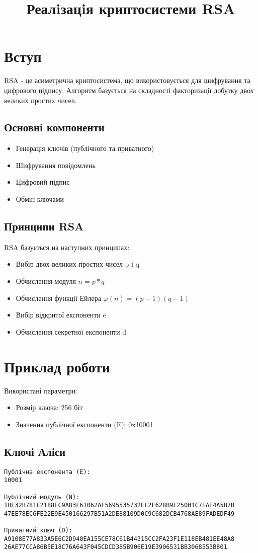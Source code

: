 \documentclass[12pt]{article}
\title{\textbf{Реалiзацiя криптосистеми RSA}}
\author{}
\date{}
\begin{document}
\maketitle

\section{Вступ}
RSA - це асиметрична криптосистема, що використовується для шифрування та цифрового підпису. Алгоритм базується на складності факторизації добутку двох великих простих чисел.

\subsection{Основні компоненти}
\begin{itemize}
  \item Генерація ключів (публічного та приватного)
  \item Шифрування повідомлень
  \item Цифровий підпис
  \item Обмін ключами
\end{itemize}

\subsection{Принципи RSA}
RSA базується на наступних принципах:
\begin{itemize}
  \item Вибір двох великих простих чисел p і q
  \item Обчислення модуля \(n = p * q\)
  \item Обчислення функції Ейлера \(φ(n) = (p-1)(q-1)\)
  \item Вибір відкритої експоненти e
  \item Обчислення секретної експоненти d
\end{itemize}

\section{Приклад роботи}

Використані параметри:
\begin{itemize}
  \item Розмір ключа: 256 біт
  \item Значення публічної експоненти (E): 0x10001
\end{itemize}

\subsection{Ключі Аліси}
\begin{verbatim}
Публічна експонента (E):
10001

Публічний модуль (N):
1BE32B781E2188EC9A83F61062AF5695535732EF2F628B9E25001C7FAE4A5B7B
47EE78EC6FE22E9E450166297B51A2DE88109D0C9C682DCB4768AE89FADEDF49

Приватний ключ (D):
A9108E77A833A5E6C2D940EA155CE78C61B44315CC2FA23F1E118EB481EE48A8
26AE77CCA86B5E18C76A643F045CDCD385B906E19E3906531BB3068553B801
\end{verbatim}
\end{document}

